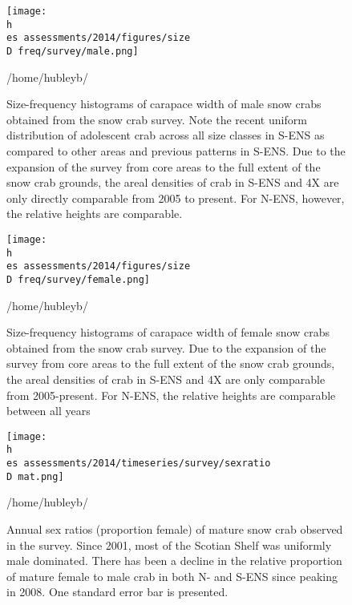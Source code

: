 \documentclass[11pt]{article}
\newcommand{\D}{.}
\newcommand{\h}{/home/hubleyb/}
\newcommand{\es}{bio.data/bio.snowcrab/}
\begin{document}

\begin{figure}
\centering
\texttt{[image: \\h \\es assessments/2014/figures/size\\D freq/survey/male.png]}\\ 
\caption{Size-frequency histograms of carapace width of male snow crabs obtained from the snow crab survey. Note the recent uniform distribution of adolescent crab across all size classes in S-ENS as compared to other areas and previous patterns in S-ENS. Due to the expansion of the survey from core areas to the full extent of the snow crab grounds, the areal densities of crab in S-ENS and 4X are only directly comparable from 2005 to present. For N-ENS, however, the relative heights are comparable. }
\h \end{figure}
\clearpage

\begin{figure}
\centering
\texttt{[image: \\h \\es assessments/2014/figures/size\\D freq/survey/female.png]}\\ 
\caption{ Size-frequency histograms of carapace width of female snow crabs obtained from the snow crab survey. Due to the expansion of the survey from core areas to the full extent of the snow crab grounds, the areal densities of crab in S-ENS and 4X are only comparable from 2005-present. For N-ENS, the relative heights are comparable between all years}
\h \end{figure}
\clearpage

\begin{figure}
\centering
\texttt{[image: \\h \\es assessments/2014/timeseries/survey/sexratio\\D mat.png]}\\ 
\caption{ Annual sex ratios (proportion female) of mature snow crab observed in the survey. Since 2001, most of the Scotian Shelf was uniformly male dominated. There has been a decline in the relative proportion of mature female to male crab in both N- and S-ENS since peaking in 2008. One standard error bar is presented.}
\h \end{figure}
\clearpage
\end{document}
